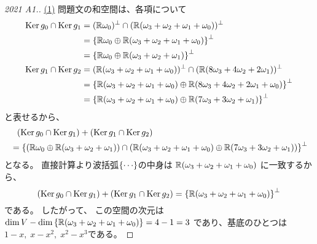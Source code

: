 \documentclass[report]{jlreq}
\begin{document}
\begin{proof}[2021 A1.]
    \uline{(1)} \quad
    問題文の和空間は、各項について
    \begin{alignat}{1}
        \operatorname{\mathrm{Ker}} g_0 \cap \operatorname{\mathrm{Ker}} g_1
            &=
                (\mathbb{R} \omega_0)^\perp
                \cap
                (\mathbb{R} (\omega_3 + \omega_2 + \omega_1 + \omega_0))^\perp
                \\
            &=
                \left\{{
                    \mathbb{R} \omega_0
                    \oplus
                    \mathbb{R} (\omega_3 + \omega_2 + \omega_1 + \omega_0)
                }\right\}^\perp
                \\
            &=
                \left\{{
                    \mathbb{R} \omega_0
                    \oplus
                    \mathbb{R} (\omega_3 + \omega_2 + \omega_1)
                }\right\}^\perp
                \\
        \operatorname{\mathrm{Ker}} g_1 \cap \operatorname{\mathrm{Ker}} g_2
            &=
                (\mathbb{R} (\omega_3 + \omega_2 + \omega_1 + \omega_0))^\perp
                \cap
                (\mathbb{R} (8 \omega_3 + 4 \omega_2 + 2 \omega_1))^\perp
                \\
            &=
                \left\{{
                    \mathbb{R} (\omega_3 + \omega_2 + \omega_1 + \omega_0)
                    \oplus
                    \mathbb{R} (8 \omega_3 + 4 \omega_2 + 2 \omega_1 + \omega_0)
                }\right\}^\perp
                \\
            &=
                \left\{{
                    \mathbb{R} (\omega_3 + \omega_2 + \omega_1 + \omega_0)
                    \oplus
                    \mathbb{R} (7 \omega_3 + 3 \omega_2 + \omega_1)
                }\right\}^\perp
    \end{alignat}
    と表せるから、
    \begin{alignat}{1}
        &\phantom{=} (\operatorname{\mathrm{Ker}} g_0 \cap \operatorname{\mathrm{Ker}} g_1) + (\operatorname{\mathrm{Ker}} g_1 \cap \operatorname{\mathrm{Ker}} g_2)
            \\
        &=
            \left\{{
                (
                    \mathbb{R} \omega_0
                    \oplus
                    \mathbb{R} (\omega_3 + \omega_2 + \omega_1)
                )
                \cap
                (
                    \mathbb{R} (\omega_3 + \omega_2 + \omega_1 + \omega_0)
                    \oplus
                    \mathbb{R} (7 \omega_3 + 3 \omega_2 + \omega_1)
                )
            }\right\}^\perp
    \end{alignat}
    となる。
    直接計算より波括弧$\left\{{ \cdots }\right\}$の中身は
    $\mathbb{R} (\omega_3 + \omega_2 + \omega_1 + \omega_0)$
    に一致するから、
    \begin{equation}
        (\operatorname{\mathrm{Ker}} g_0 \cap \operatorname{\mathrm{Ker}} g_1) + (\operatorname{\mathrm{Ker}} g_1 \cap \operatorname{\mathrm{Ker}} g_2)
            = \left\{{
                \mathbb{R} (\omega_3 + \omega_2 + \omega_1 + \omega_0)
            }\right\}^\perp
    \end{equation}
    である。
    したがって、
    この空間の次元は
    $\dim V - \dim \left\{{\mathbb{R} (\omega_3 + \omega_2 + \omega_1 + \omega_0)}\right\} = 4 - 1 = 3$
    であり、基底のひとつは
    $1 - x, \; x - x^2, \; x^2 - x^3$である。


\end{proof}
\end{document}

